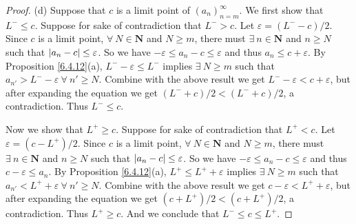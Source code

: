 \begin{proof}{(d)}
Suppose that \(c\) is a limit point of \((a_n)_{n = m}^\infty\).
We first show that \(L^- \leq c\).
Suppose for sake of contradiction that \(L^- > c\).
Let \(\varepsilon = (L^- - c) / 2\).
Since \(c\) is a limit point, \(\forall\ N \in \mathbf{N}\) and \(N \geq m\), there must \(\exists\ n \in \mathbf{N}\) and \(n \geq N\) such that \(\abs*{a_n - c} \leq \varepsilon\).
So we have \(-\varepsilon \leq a_n - c \leq \varepsilon\) and thus \(a_n \leq c + \varepsilon\).
By Proposition \ref{6.4.12}(a), \(L^- - \varepsilon \leq L^-\) implies \(\exists\ N \geq m\) such that \(a_{n'} > L^- - \varepsilon \ \forall\ n' \geq N\).
Combine with the above result we get \(L^- - \varepsilon < c + \varepsilon\), but after expanding the equation we get \((L^- + c) / 2 < (L^- + c) / 2\), a contradiction.
Thus \(L^- \leq c\).

Now we show that \(L^+ \geq c\).
Suppose for sake of contradiction that \(L^+ < c\).
Let \(\varepsilon = (c - L^+) / 2\).
Since \(c\) is a limit point, \(\forall\ N \in \mathbf{N}\) and \(N \geq m\), there must \(\exists\ n \in \mathbf{N}\) and \(n \geq N\) such that \(\abs*{a_n - c} \leq \varepsilon\).
So we have \(-\varepsilon \leq a_n - c \leq \varepsilon\) and thus \(c - \varepsilon \leq a_n\).
By Proposition \ref{6.4.12}(a), \(L^+ \leq L^+ + \varepsilon\) implies \(\exists\ N \geq m\) such that \(a_{n'} < L^+ + \varepsilon \ \forall\ n' \geq N\).
Combine with the above result we get \(c - \varepsilon < L^+ + \varepsilon\), but after expanding the equation we get \((c + L^+) / 2 < (c + L^+) / 2\), a contradiction.
Thus \(L^+ \geq c\).
And we conclude that \(L^- \leq c \leq L^+\).
\end{proof}


